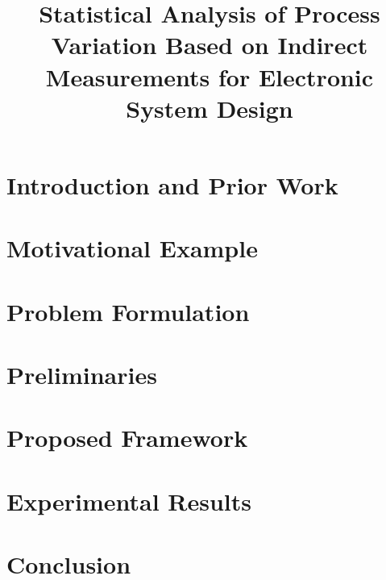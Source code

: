 \documentclass[9pt,conference]{IEEEtran}
\begin{document}
  \title{Statistical Analysis of Process Variation Based on Indirect Measurements for Electronic System Design}

  \author{
    
  }

  \maketitle

  \begin{abstract}
    
  \end{abstract}

  \section{Introduction and Prior Work} 
  

  \section{Motivational Example} 
  

  \section{Problem Formulation} 
  

  \section{Preliminaries} 
  

  \section{Proposed Framework} 
  

  \section{Experimental Results} 
  

  \section{Conclusion} 
  

  \printbibliography
\end{document}
